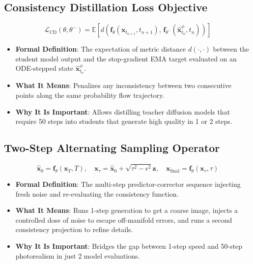 \documentclass[11pt,a4paper]{article}
\theoremstyle{definition}
\begin{document}
\subsection{Consistency Distillation Loss Objective}
{\boldmath
\begin{equation}
\mathcal{L}_{\text{CD}}(\theta, \theta^-) = \mathbb{E}\left[ d\left( \mathbf{f}_\theta(\mathbf{x}_{t_{n+1}}, t_{n+1}), \, \mathbf{f}_{\theta^-}(\hat{\mathbf{x}}_{t_n}^{\phi}, t_n) \right) \right]
\end{equation}
}
\begin{itemize}
    \item \textbf{Formal Definition}: The expectation of metric distance $d(\cdot, \cdot)$ between the student model output and the stop-gradient EMA target evaluated on an ODE-stepped state $\hat{\mathbf{x}}_{t_n}^\phi$.
    \item \textbf{What It Means}: Penalizes any inconsistency between two consecutive points along the same probability flow trajectory.
    \item \textbf{Why It Is Important}: Allows distilling teacher diffusion models that require 50 steps into students that generate high quality in 1 or 2 steps.
\end{itemize}

\subsection{Two-Step Alternating Sampling Operator}
{\boldmath
\begin{equation}
\hat{\mathbf{x}}_0 = \mathbf{f}_\theta(\mathbf{x}_T, T), \quad \mathbf{x}_{\tau} = \hat{\mathbf{x}}_0 + \sqrt{\tau^2 - \epsilon^2}\mathbf{z}, \quad \mathbf{x}_{\text{final}} = \mathbf{f}_\theta(\mathbf{x}_{\tau}, \tau)
\end{equation}
}
\begin{itemize}
    \item \textbf{Formal Definition}: The multi-step predictor-corrector sequence injecting fresh noise and re-evaluating the consistency function.
    \item \textbf{What It Means}: Runs 1-step generation to get a coarse image, injects a controlled dose of noise to escape off-manifold errors, and runs a second consistency projection to refine details.
    \item \textbf{Why It Is Important}: Bridges the gap between 1-step speed and 50-step photorealism in just 2 model evaluations.
\end{itemize}
\end{document}
